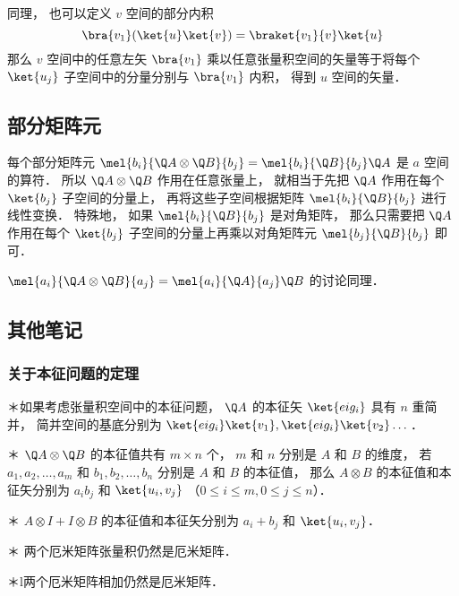 同理， 也可以定义 $v$ 空间的部分内积
\begin{equation}
\bra{v_1}(\ket{u}\ket{v}) = \braket{v_1}{v} \ket{u}
\end{equation}
那么 $v$ 空间中的任意左矢 $\bra{v_1}$ 乘以任意张量积空间的矢量等于将每个 $\ket{u_j}$ 子空间中的分量分别与 $\bra{v_1}$ 内积， 得到 $u$ 空间的矢量．

\subsection{部分矩阵元}
每个部分矩阵元 $\mel{b_i}{\Q A \otimes \Q B}{b_j} = \mel{b_i}{\Q B}{b_j} \Q A$ 是 $a$ 空间的算符． 所以 $\Q A \otimes \Q B$ 作用在任意张量上， 就相当于先把 $\Q A$ 作用在每个 $\ket{b_j}$ 子空间的分量上， 再将这些子空间根据矩阵 $\mel{b_i}{\Q B}{b_j}$ 进行线性变换． 特殊地， 如果 $\mel{b_i}{\Q B}{b_j}$ 是对角矩阵， 那么只需要把 $\Q A$ 作用在每个 $\ket{b_j}$ 子空间的分量上再乘以对角矩阵元 $\mel{b_j}{\Q B}{b_j}$ 即可．

$\mel{a_i}{\Q A \otimes \Q B}{a_j} = \mel{a_i}{\Q A}{a_j} \Q B$ 的讨论同理．

\subsection{其他笔记}

\subsubsection{关于本征问题的定理}%
	
＊如果考虑张量积空间中的本征问题， $\Q A$  的本征矢 $\ket{eig_i}$ 具有 $n$ 重简并， 简并空间的基底分别为 $\ket{eig_i}\ket{v_1}, \ket{eig_i}\ket{v_2}\dots$． 

＊ $\Q A \otimes \Q B$ 的本征值共有 $m \times n$ 个， $m$ 和 $n$ 分别是 $A$ 和 $B$ 的维度， 若 $a_1, a_2,\dots, a_m$ 和 $b_1, b_2, \dots, b_n$ 分别是 $A$ 和 $B$ 的本征值， 那么 $A \otimes B$ 的本征值和本征矢分别为 $a_i b_j$ 和 $\ket{u_i, v_j}$ （$0 \leqslant i \leqslant m,  0 \leqslant j \leqslant n$）．

＊ $A \otimes I + I \otimes B$ 的本征值和本征矢分别为 $a_i + b_j$ 和 $\ket{u_i, v_j}$． 

＊ 两个厄米矩阵张量积仍然是厄米矩阵．

＊l两个厄米矩阵相加仍然是厄米矩阵．

